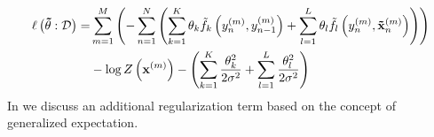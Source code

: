 \begin{equation}
  \label{equ:log-likelihood-linear-chain-crf-log-linear-gaussian}
  \begin{split}
    \ell\left(\mathbf{\tilde{\theta}}:\mathcal{D}\right) = & \sum_{m=1}^M \left(-\sum_{n=1}^N \left(\sum_{k=1}^K\theta_k \tilde{f}_k\left(\vphantom{\tilde{x}}y_n^{(m)},y_{n-1}^{(m)}\right)+\sum_{l=1}^L\theta_l \tilde{f}_l\left(y_n^{(m)},\mathbf{\tilde{x}}_n^{(m)}\right)\right)\right) \\
    & -\log Z\left(\mathbf{x}^{(m)}\right)-\left(\sum_{k=1}^K\frac{\theta_k^2}{2\sigma^2}+\sum_{l=1}^L\frac{\theta_l^2}{2\sigma^2}\right)
 \end{split}
\end{equation}
In  we discuss an additional regularization term based on the concept of \gls{generalized expectation}.

\bigskip

